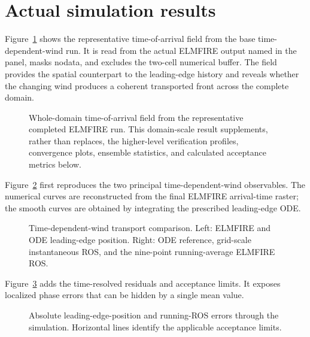\section{Actual simulation results}

Figure~\ref{fig:domain-result} shows the representative time-of-arrival field from the base time-dependent-wind run.
It is read from the actual ELMFIRE output named in the panel, masks nodata, and excludes
the two-cell numerical buffer.  The field provides the spatial counterpart to the leading-edge history and reveals whether the changing wind produces a coherent transported front across the complete domain.

\begin{figure}[H]
\centering
{}
\caption{Whole-domain time-of-arrival field from the representative completed ELMFIRE run.  This
domain-scale result supplements, rather than replaces, the higher-level verification
profiles, convergence plots, ensemble statistics, and calculated acceptance metrics below.}
\label{fig:domain-result}
\end{figure}


Figure~\ref{fig:time-dependent-wind} first reproduces the two principal
time-dependent-wind observables. The numerical curves are reconstructed from
the final ELMFIRE arrival-time raster; the smooth curves are obtained by
integrating the prescribed leading-edge ODE.

\begin{figure}[H]
\centering
{}
\caption{Time-dependent-wind transport comparison. Left: ELMFIRE and ODE
leading-edge position. Right: ODE reference, grid-scale instantaneous ROS, and
the nine-point running-average ELMFIRE ROS.}
\label{fig:time-dependent-wind}
\end{figure}

Figure~\ref{fig:time-dependent-errors} adds the time-resolved residuals and
acceptance limits. It exposes localized phase errors that can be hidden by a
single mean value.

\begin{figure}[H]
\centering
{}
\caption{Absolute leading-edge-position and running-ROS errors through the
simulation. Horizontal lines identify the applicable acceptance limits.}
\label{fig:time-dependent-errors}
\end{figure}

